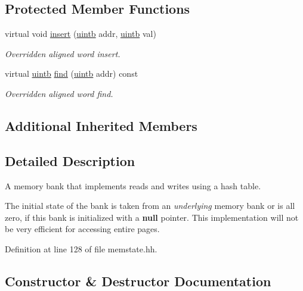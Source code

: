 \subsection*{Protected Member Functions}
\begin{DoxyCompactItemize}
\item 
virtual void \mbox{\hyperlink{class_memory_hash_overlay_a7fe029e98139fe7a6fe68b2d4380e3e0}{insert}} (\mbox{\hyperlink{types_8h_a2db313c5d32a12b01d26ac9b3bca178f}{uintb}} addr, \mbox{\hyperlink{types_8h_a2db313c5d32a12b01d26ac9b3bca178f}{uintb}} val)
\begin{DoxyCompactList}\small\item\em Overridden aligned word insert. \end{DoxyCompactList}\item 
virtual \mbox{\hyperlink{types_8h_a2db313c5d32a12b01d26ac9b3bca178f}{uintb}} \mbox{\hyperlink{class_memory_hash_overlay_aeef0c9ae78be16ddd22f8a58e1eef419}{find}} (\mbox{\hyperlink{types_8h_a2db313c5d32a12b01d26ac9b3bca178f}{uintb}} addr) const
\begin{DoxyCompactList}\small\item\em Overridden aligned word find. \end{DoxyCompactList}\end{DoxyCompactItemize}
\subsection*{Additional Inherited Members}


\subsection{Detailed Description}
A memory bank that implements reads and writes using a hash table. 

The initial state of the bank is taken from an {\itshape underlying} memory bank or is all zero, if this bank is initialized with a {\bfseries{null}} pointer. This implementation will not be very efficient for accessing entire pages. 

Definition at line 128 of file memstate.\+hh.



\subsection{Constructor \& Destructor Documentation}
\mbox{\label{class_memory_hash_overlay_aa5e7123b11ee1ea2ef27ffc43210a803}} 
